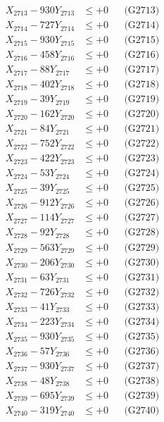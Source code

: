\documentclass[a4paper,10pt]{article}
\begin{document}
{\begin{align}
X_{2713} - 930Y_{2713} &\leq +0 && \text{(G2713)} \\
X_{2714} - 727Y_{2714} &\leq +0 && \text{(G2714)} \\
X_{2715} - 930Y_{2715} &\leq +0 && \text{(G2715)} \\
X_{2716} - 458Y_{2716} &\leq +0 && \text{(G2716)} \\
X_{2717} - 88Y_{2717} &\leq +0 && \text{(G2717)} \\
X_{2718} - 402Y_{2718} &\leq +0 && \text{(G2718)} \\
X_{2719} - 39Y_{2719} &\leq +0 && \text{(G2719)} \\
X_{2720} - 162Y_{2720} &\leq +0 && \text{(G2720)} \\
\allowbreak
X_{2721} - 84Y_{2721} &\leq +0 && \text{(G2721)} \\
X_{2722} - 752Y_{2722} &\leq +0 && \text{(G2722)} \\
X_{2723} - 422Y_{2723} &\leq +0 && \text{(G2723)} \\
X_{2724} - 53Y_{2724} &\leq +0 && \text{(G2724)} \\
X_{2725} - 39Y_{2725} &\leq +0 && \text{(G2725)} \\
X_{2726} - 912Y_{2726} &\leq +0 && \text{(G2726)} \\
X_{2727} - 114Y_{2727} &\leq +0 && \text{(G2727)} \\
X_{2728} - 92Y_{2728} &\leq +0 && \text{(G2728)} \\
X_{2729} - 563Y_{2729} &\leq +0 && \text{(G2729)} \\
X_{2730} - 206Y_{2730} &\leq +0 && \text{(G2730)} \\
\allowbreak
X_{2731} - 63Y_{2731} &\leq +0 && \text{(G2731)} \\
X_{2732} - 726Y_{2732} &\leq +0 && \text{(G2732)} \\
X_{2733} - 41Y_{2733} &\leq +0 && \text{(G2733)} \\
X_{2734} - 223Y_{2734} &\leq +0 && \text{(G2734)} \\
X_{2735} - 930Y_{2735} &\leq +0 && \text{(G2735)} \\
X_{2736} - 57Y_{2736} &\leq +0 && \text{(G2736)} \\
X_{2737} - 930Y_{2737} &\leq +0 && \text{(G2737)} \\
X_{2738} - 48Y_{2738} &\leq +0 && \text{(G2738)} \\
X_{2739} - 695Y_{2739} &\leq +0 && \text{(G2739)} \\
X_{2740} - 319Y_{2740} &\leq +0 && \text{(G2740)} \\

\end{align}}
\end{document}
